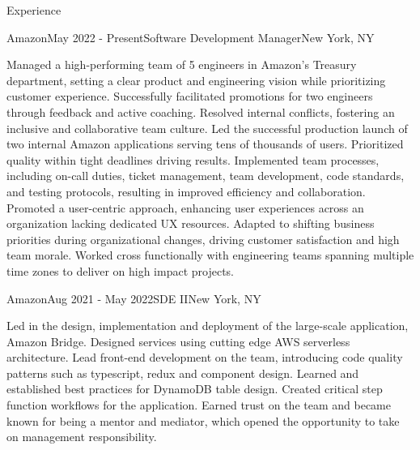 \documentclass{resume} %
\begin{document}

\begin{rSection}{Experience}


\begin{rSubsection}{Amazon}{May 2022 - Present}{Software Development Manager}{New York, NY}

Managed a high-performing team of 5 engineers in Amazon's Treasury department, setting a clear
product and engineering vision while prioritizing customer experience. Successfully facilitated
promotions for two engineers through feedback and active coaching. Resolved internal conflicts, 
fostering an inclusive and collaborative team culture. Led the successful production launch of two 
internal Amazon applications serving tens of thousands of users. Prioritized quality within tight
deadlines driving results. Implemented team processes, including on-call duties, ticket management, team
development, code standards, and testing protocols, resulting in improved efficiency and collaboration.
Promoted a user-centric approach, enhancing user experiences across an organization lacking dedicated UX
resources. Adapted to shifting business priorities during organizational changes, driving customer
satisfaction and high team morale. Worked cross functionally with engineering teams spanning multiple time 
zones to deliver on high impact projects.

\end{rSubsection}
\begin{rSubsection}{Amazon}{Aug 2021 - May 2022}{SDE II}{New York, NY}

Led in the design, implementation and deployment of the large-scale application, Amazon Bridge. 
Designed services using cutting edge AWS serverless architecture. Lead front-end development on 
the team, introducing code quality patterns such as typescript, redux and component design. 
Learned and established best practices for DynamoDB table design. Created critical step 
function workflows for the application. Earned trust on the team and became known for being a 
mentor and mediator, which opened the opportunity to take on management responsibility.

\end{rSubsection}


\end{rSection}
\end{document}
